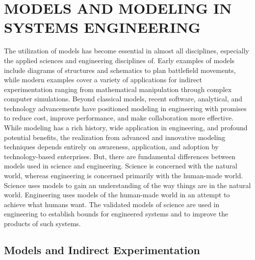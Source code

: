\chapter{MODELS AND MODELING IN SYSTEMS ENGINEERING}\label{chap:7}

The utilization of models has become essential in almost all disciplines, especially the applied sciences and engineering disciplines of. Early examples of models include diagrams of structures and schematics to plan battlefield movements, while modern examples cover a variety of applications for indirect experimentation ranging from mathematical manipulation through complex computer simulations.
Beyond classical models, recent software, analytical, and technology advancements have positioned modeling in engineering with promises to reduce cost, improve performance, and make collaboration more effective. While modeling has a rich history, wide application in engineering, and profound potential benefits, the realization from advanced and innovative modeling techniques depends entirely on awareness, application, and adoption by technology-based enterprises.
But, there are fundamental differences between models used in science and engineering. Science is concerned with the natural world, whereas engineering is concerned primarily with the human-made world. Science uses models to gain an understanding of the way things are in the natural world. Engineering uses models of the human-made world in an attempt to achieve what humans want. The validated models of science are used in engineering to establish bounds for engineered systems and to improve the products of such systems.


\section{Models and Indirect Experimentation}

